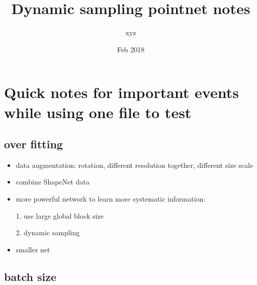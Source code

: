 \documentclass{article}
\title{Dynamic sampling pointnet notes}
\author{xyz}
\date{Feb 2018}
\begin{document}
\begin{titlepage}
\maketitle
\end{titlepage}	

\tableofcontents{}

\section{Quick notes for important events while using one file to test}

\subsection{over fitting}
\begin{itemize}
	\item data augmentation: rotation, different resolution together, different size scale
	\item combine ShapeNet data
	\item more powerful network to learn more systematic information:\par
	1. use large global block size\par
	2. dynamic sampling
	\item smaller net
	
\end{itemize}


\subsection{batch size}
\end{document}
